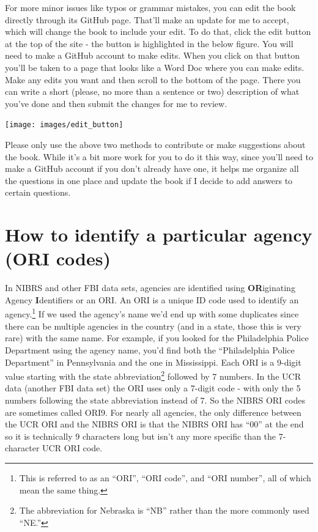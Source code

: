 \documentclass[
]{krantz}
\let\origfigure\figure
\let\endorigfigure\endfigure
\renewenvironment{figure}[1][2] {
    \expandafter\origfigure\expandafter[H]
} {
    \endorigfigure
}
\begin{document}
For more minor issues like typos or grammar mistakes, you
can edit the book directly through its GitHub page. That'll
make an update for me to accept, which will change the book
to include your edit. To do that, click the edit button at
the top of the site - the button is highlighted in the below
figure. You will need to make a GitHub account to make
edits. When you click on that button you'll be taken to a
page that looks like a Word Doc where you can make edits.
Make any edits you want and then scroll to the bottom of the
page. There you can write a short (please, no more than a
sentence or two) description of what you've done and then
submit the changes for me to review.

\begin{figure}

{\centering \texttt{[image: images/edit\_button]} 

}

\caption{The edit button for how to make edits of this book.}\label{fig:unnamed-chunk-3}
\end{figure}

Please only use the above two methods to contribute or make
suggestions about the book. While it's a bit more work for
you to do it this way, since you'll need to make a GitHub
account if you don't already have one, it helps me organize
all the questions in one place and update the book if I
decide to add answers to certain questions.

\section{How to identify a particular agency (ORI
codes)}\label{ori}

In NIBRS and other FBI data sets, agencies are identified
using \textbf{OR}iginating Agency \textbf{I}dentifiers or an
ORI. An ORI is a unique ID code used to identify an
agency.\footnote{This is referred to as an ``ORI'', ``ORI
  code'', and ``ORI number'', all of which mean the same
  thing.} If we used the agency's name we'd end up with some
duplicates since there can be multiple agencies in the
country (and in a state, those this is very rare) with the
same name. For example, if you looked for the Philadelphia
Police Department using the agency name, you'd find both the
``Philadelphia Police Department'' in Pennsylvania and the
one in Mississippi. Each ORI is a 9-digit value starting
with the state abbreviation\footnote{The abbreviation for
  Nebraska is ``NB'' rather than the more commonly used
  ``NE.''} followed by 7 numbers. In the UCR data (another
FBI data set) the ORI uses only a 7-digit code - with only
the 5 numbers following the state abbreviation instead of 7.
So the NIBRS ORI codes are sometimes called ORI9. For nearly
all agencies, the only difference between the UCR ORI and
the NIBRS ORI is that the NIBRS ORI has ``00'' at the end so
it is technically 9 characters long but isn't any more
specific than the 7-character UCR ORI code.
\end{document}
